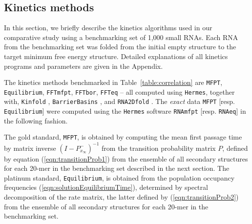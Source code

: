 \subsection{Kinetics methods}

In this section, we briefly describe the kinetics algorithms used in our
comparative study using a benchmarking set of 1,000 small RNAs. Each RNA from
the benchmarking set was folded from the initial empty structure to the
target minimum free energy structure.  Detailed
explanations of all kinetics programs and parameters are given
in the Appendix.

The kinetics methods benchmarked in Table~\ref{table:correlation}
are {\tt MFPT},
{\tt Equilibrium},
{\tt FFTmfpt},
{\tt FFTbor},
{\tt FFTeq} -- all computed using {\tt Hermes}, together with,
{\tt Kinfold} \cite{flammHofacker},
{\tt BarrierBasins} \cite{wolfingerStadler:kinetics},
and {\tt RNA2Dfold} \cite{hofacker:RNAbor2D}. The {\em exact} data {\tt MFPT}
[resp. {\tt Equilibrium}] were computed using the {\tt Hermes} software {\tt RNAmfpt}
[resp. {\tt RNAeq}] in the following fashion.

The gold standard, {\tt MFPT}, is obtained by computing the
mean first passage time by matrix inverse $(I - P^{-}_{x_{\infty}})^{-1}$
from the transition probability matrix $P$, defined by equation
(\ref{eqn:transitionProb1}) from the ensemble of all secondary structures
for each 20-mer in the benchmarking set described in the next section.
The platinum standard, {\tt Equilibrium}, is obtained from the
population occupancy frequencies
(\ref{eqn:solutionEquilibriumTime}), determined by spectral decomposition
of the rate matrix, the latter defined by
(\ref{eqn:transitionProb2}) from the ensemble of all secondary structures
for each 20-mer in the benchmarking set.

